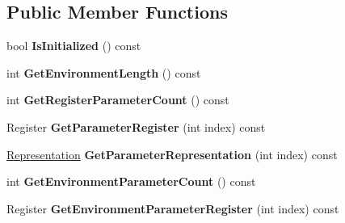 \subsection*{Public Member Functions}
\begin{DoxyCompactItemize}
\item 
\hypertarget{classv8_1_1internal_1_1_interface_descriptor_abb1320d43ab376fc7f4ef238a3bc0623}{}bool {\bfseries Is\+Initialized} () const \label{classv8_1_1internal_1_1_interface_descriptor_abb1320d43ab376fc7f4ef238a3bc0623}

\item 
\hypertarget{classv8_1_1internal_1_1_interface_descriptor_a6006e4d7e526ce25d7e0b73d98a9665c}{}int {\bfseries Get\+Environment\+Length} () const \label{classv8_1_1internal_1_1_interface_descriptor_a6006e4d7e526ce25d7e0b73d98a9665c}

\item 
\hypertarget{classv8_1_1internal_1_1_interface_descriptor_aa5181ef4e11e1f7f37af3ac003c922be}{}int {\bfseries Get\+Register\+Parameter\+Count} () const \label{classv8_1_1internal_1_1_interface_descriptor_aa5181ef4e11e1f7f37af3ac003c922be}

\item 
\hypertarget{classv8_1_1internal_1_1_interface_descriptor_a7f889f681d0a0bbd0d70a052fd1ca6cd}{}Register {\bfseries Get\+Parameter\+Register} (int index) const \label{classv8_1_1internal_1_1_interface_descriptor_a7f889f681d0a0bbd0d70a052fd1ca6cd}

\item 
\hypertarget{classv8_1_1internal_1_1_interface_descriptor_a9a4784b96a541bd6d443006d65e96a1d}{}\hyperlink{classv8_1_1internal_1_1_representation}{Representation} {\bfseries Get\+Parameter\+Representation} (int index) const \label{classv8_1_1internal_1_1_interface_descriptor_a9a4784b96a541bd6d443006d65e96a1d}

\item 
\hypertarget{classv8_1_1internal_1_1_interface_descriptor_aa6f7f47b1b53c6a23ff88d49c8ebfe5b}{}int {\bfseries Get\+Environment\+Parameter\+Count} () const \label{classv8_1_1internal_1_1_interface_descriptor_aa6f7f47b1b53c6a23ff88d49c8ebfe5b}

\item 
\hypertarget{classv8_1_1internal_1_1_interface_descriptor_a6bf5b1deb822e2b093cc470256f11193}{}Register {\bfseries Get\+Environment\+Parameter\+Register} (int index) const \label{classv8_1_1internal_1_1_interface_descriptor_a6bf5b1deb822e2b093cc470256f11193}


\end{DoxyCompactItemize}
